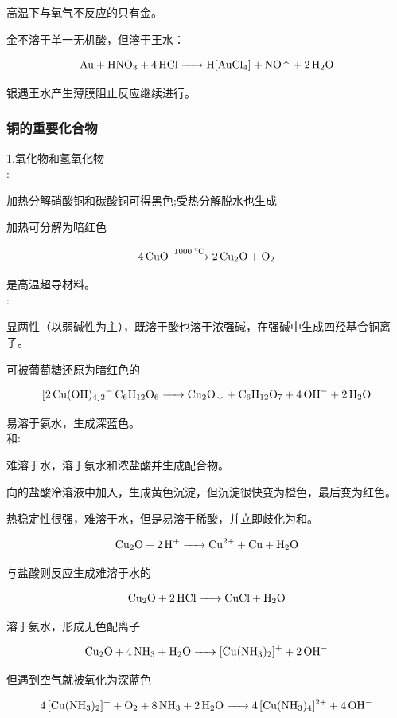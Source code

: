 \documentclass[a4paper,UTF8]{article}
\begin{document}
高温下与氧气不反应的只有金。

金不溶于单一无机酸，但溶于王水：

$$ \ce{Au + HNO3 + 4HCl ->H[AuCl4] + NO ^ + 2H2O} $$

银遇王水产生薄膜阻止反应继续进行。

\subsubsection{铜的重要化合物}
1.氧化物和氢氧化物\\

:

加热分解硝酸铜和碳酸铜可得黑色;受热分解脱水也生成

加热可分解为暗红色

$$ \ce{4CuO ->[1000^\circ C] 2Cu2O + O2} $$

是高温超导材料。\\

:

显两性（以弱碱性为主），既溶于酸也溶于浓强碱，在强碱中生成四羟基合铜离子。

可被葡萄糖还原为暗红色的

$$ \ce{[2Cu(OH)4]2- C6H12O6 -> Cu2O v + C6H12O7 + 4OH- + 2H2O} $$

易溶于氨水，生成深蓝色。\\

和:

难溶于水，溶于氨水和浓盐酸并生成配合物。

向的盐酸冷溶液中加入，生成黄色沉淀，但沉淀很快变为橙色，最后变为红色。

热稳定性很强，难溶于水，但是易溶于稀酸，并立即歧化为和。

$$ \ce{Cu2O + 2H+ -> Cu^{2+} + Cu + H2O} $$

与盐酸则反应生成难溶于水的

$$ \ce{Cu2O + 2HCl -> CuCl + H2O} $$

溶于氨水，形成无色配离子\ce{[Cu(NH3)2]^{+}}

$$ \ce{Cu2O + 4NH3 + H2O -> [Cu(NH3)2]^{+} + 2OH-} $$

但\ce{[Cu(NH3)2]^{+}}遇到空气就被氧化为深蓝色

$$ \ce{4[Cu(NH3)2]^{+} + O2 + 8NH3 + 2H2O -> 4[Cu(NH3)4]^{2+} + 4OH-} $$\\
\end{document}

